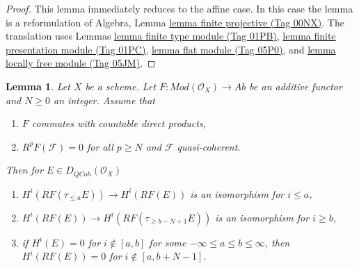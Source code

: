 \documentclass{amsart}
\theoremstyle{plain}
\newtheorem{lemma}[subsection]{Lemma}
\theoremstyle{definition}
\theoremstyle{remark}
\numberwithin{equation}{subsection}
\def\QCoh{\mathit{QCoh}}
\begin{document}
\begin{proof}
This lemma immediately reduces to the affine case.
In this case the lemma is a reformulation of
Algebra, Lemma \href{https://stacks.math.columbia.edu/tag/00NX}{lemma finite projective (Tag 00NX)}.
The translation uses
Lemmas \href{https://stacks.math.columbia.edu/tag/01PB}{lemma finite type module (Tag 01PB)},
\href{https://stacks.math.columbia.edu/tag/01PC}{lemma finite presentation module (Tag 01PC)},
\href{https://stacks.math.columbia.edu/tag/05P0}{lemma flat module (Tag 05P0)}, and
\href{https://stacks.math.columbia.edu/tag/05JM}{lemma locally free module (Tag 05JM)}.
\end{proof}


\begin{lemma}
\label{lemma-application-nice-K-injective}
Let $X$ be a scheme. Let $F : \textit{Mod}(\mathcal{O}_X) \to \textit{Ab}$
be an additive functor and $N \geq 0$ an integer. Assume that
\begin{enumerate}
\item $F$ commutes with countable direct products,
\item $R^pF(\mathcal{F}) = 0$ for all $p \geq N$ and $\mathcal{F}$
quasi-coherent.
\end{enumerate}
Then for $E \in D_\QCoh(\mathcal{O}_X)$
\begin{enumerate}
\item $H^i(RF(\tau_{\leq a}E)) \to H^i(RF(E))$ is an isomorphism
for $i \leq a$,
\item $H^i(RF(E)) \to H^i(RF(\tau_{\geq b - N + 1}E))$ is an isomorphism
for $i \geq b$,
\item if $H^i(E) = 0$ for $i \not \in [a, b]$ for some
$-\infty \leq a \leq b \leq \infty$, then $H^i(RF(E)) = 0$
for $i \not \in [a, b + N - 1]$.
\end{enumerate}
\end{lemma}
\end{document}
